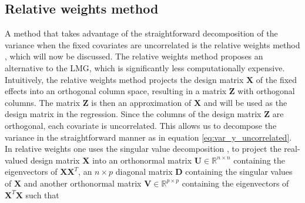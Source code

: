 \subsection{Relative weights method}
\label{sec:relativeweights}
A method that takes advantage of the straightforward decomposition of the variance when the fixed covariates are uncorrelated is the relative weights method \citep{johnson_relative_weights}, which will now be discussed.
\newline
\newline
The relative weights method proposes an alternative to the LMG, which is significantly less computationally expensive. 
Intuitively, the relative weights method projects the design matrix $\mathbf{X}$ of the fixed effects into an orthogonal column space, resulting in a matrix $\mathbf{Z}$ with orthogonal columns.
The matrix $\mathbf{Z}$ is then an approximation of $\mathbf{X}$ and will be used as the design matrix in the regression. Since the columns of the design matrix $\mathbf{Z}$ are orthogonal, each covariate is uncorrelated. 
This allows us to decompose the variance in the straightforward manner as in equation \eqref{eq:var_y_uncorrelated}.
\newline
\newline
In relative weights one uses the singular value decomposition \citep{relative_weights_nimon_oswald}, to project the real-valued design matrix $\mathbf{X}$ into an orthonormal matrix $\mathbf{U} \in \mathbb{R}^{n \times n}$ containing the eigenvectors of $\mathbf{X}\mathbf{X}^T$, an $n\times p$ diagonal matrix $\mathbf{D}$ containing the singular values of $\mathbf{X}$ and another orthonormal matrix $\mathbf{V} \in \mathbb{R}^{p \times p}$ containing the eigenvectors of $\mathbf{X}^T\mathbf{X}$ such that

